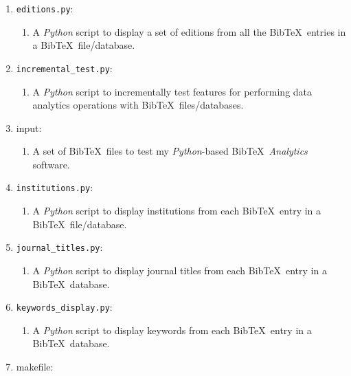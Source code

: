 \begin{enumerate}
\begin{enumerate}
	\end{enumerate}
\item {\tt editions.py}: \vspace{-0.3cm}
	\begin{enumerate} \itemsep -2pt
	\item A {\it Python} script to display a set of editions from all the {\sc Bib}\TeX\ entries in a {\sc Bib}\TeX\ file/database.
	\end{enumerate}
\item {\tt incremental\_test.py}: \vspace{-0.3cm}
	\begin{enumerate} \itemsep -2pt
	\item A {\it Python} script to incrementally test features for performing data analytics operations with {\sc Bib}\TeX\ files/databases.
	\end{enumerate}
\item input: \vspace{-0.3cm}
	\begin{enumerate} \itemsep -2pt
	\item A set of {\sc Bib}\TeX\ files to test my {\it Python}-based {\sc Bib}\TeX\ {\it Analytics} software.
	\end{enumerate}
\item {\tt institutions.py}: \vspace{-0.3cm}
	\begin{enumerate} \itemsep -2pt
	\item A {\it Python} script to display institutions from each {\sc Bib}\TeX\ entry in a {\sc Bib}\TeX\ file/database.
	\end{enumerate}
\item {\tt journal\_titles.py}: \vspace{-0.3cm}
	\begin{enumerate} \itemsep -2pt
	\item A {\it Python} script to display journal titles from each {\sc Bib}\TeX\ entry in a {\sc Bib}\TeX\ database.
	\end{enumerate}
\item {\tt keywords\_display.py}: \vspace{-0.3cm}
	\begin{enumerate} \itemsep -2pt
	\item A {\it Python} script to display keywords from each {\sc Bib}\TeX\ entry in a {\sc Bib}\TeX\ database.
	\end{enumerate}
\item makefile: \vspace{-0.3cm}

\end{enumerate}
